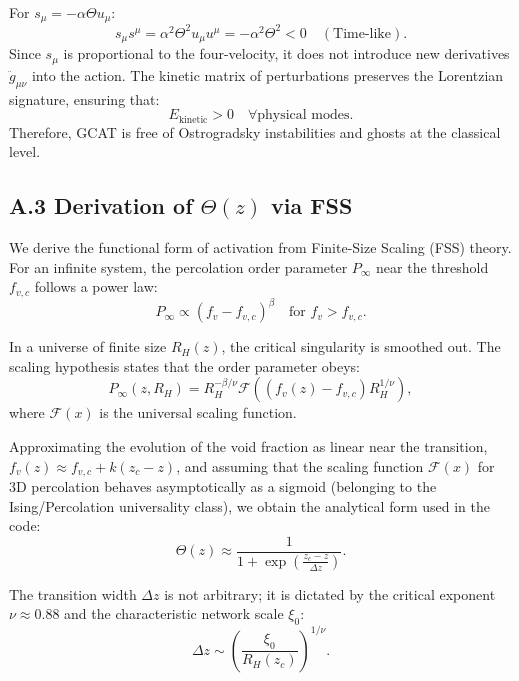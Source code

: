 \documentclass[12pt, a4paper]{article}
\theoremstyle{plain}
\theoremstyle{definition}
\begin{document}
For $s_\mu = -\alpha \Theta u_\mu$:
\begin{equation}
s_\mu s^\mu = \alpha^2 \Theta^2 u_\mu u^\mu = -\alpha^2 \Theta^2 < 0 \quad (\text{Time-like}).
\end{equation}
Since $s_\mu$ is proportional to the four-velocity, it does not introduce new derivatives $\ddot{g}_{\mu\nu}$ into the action. The kinetic matrix of perturbations preserves the Lorentzian signature, ensuring that:
\begin{equation}
E_{\text{kinetic}} > 0 \quad \forall \text{physical modes}.
\end{equation}
Therefore, GCAT is free of Ostrogradsky instabilities and ghosts at the classical level.

\subsection{A.3 Derivation of \texorpdfstring{$\Theta(z)$}{Theta(z)} via FSS}
\label{app:fss_derivation}

We derive the functional form of activation from Finite-Size Scaling (FSS) theory.
For an infinite system, the percolation order parameter $P_\infty$ near the threshold $f_{v,c}$ follows a power law:
\begin{equation}
P_\infty \propto (f_v - f_{v,c})^\beta \quad \text{for } f_v > f_{v,c}.
\end{equation}

In a universe of finite size $R_H(z)$, the critical singularity is smoothed out. The scaling hypothesis states that the order parameter obeys:
\begin{equation}
P_\infty(z, R_H) = R_H^{-\beta/\nu} \mathcal{F}\left( (f_v(z) - f_{v,c}) R_H^{1/\nu} \right),
\end{equation}
where $\mathcal{F}(x)$ is the universal scaling function.

Approximating the evolution of the void fraction as linear near the transition, $f_v(z) \approx f_{v,c} + k(z_c - z)$, and assuming that the scaling function $\mathcal{F}(x)$ for 3D percolation behaves asymptotically as a sigmoid (belonging to the Ising/Percolation universality class), we obtain the analytical form used in the code:
\begin{equation}
\Theta(z) \approx \frac{1}{1 + \exp\left(\frac{z_c - z}{\Delta z}\right)}.
\end{equation}

The transition width $\Delta z$ is not arbitrary; it is dictated by the critical exponent $\nu \approx 0.88$ and the characteristic network scale $\xi_0$:
\begin{equation}
\Delta z \sim \left(\frac{\xi_0}{R_H(z_c)}\right)^{1/\nu}.
\end{equation}
\end{document}
